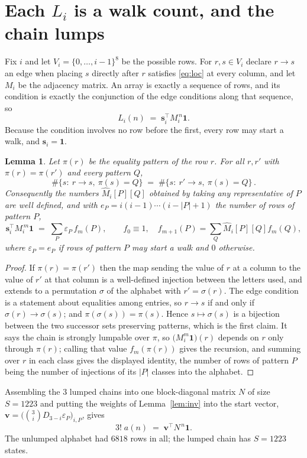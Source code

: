 \documentclass[11pt,a4paper]{article}
\theoremstyle{plain}
\newtheorem{lemma}[theorem]{Lemma}
\theoremstyle{definition}
\begin{document}
\section{Each $L_i$ is a walk count, and the chain lumps}

Fix $i$ and let $V_i=\{0,\dots,i-1\}^{8}$ be the possible rows. For $r,s\in V_i$
declare $r\to s$ an edge when placing $s$ directly after $r$ satisfies \eqref{eq:loc} at
every column, and let $M_i$ be the adjacency matrix. An array is exactly a sequence of
rows, and its condition is exactly the conjunction of the edge conditions along that
sequence, so
\[
L_i(n)\;=\;\mathbf{s}_i^{\!\top}M_i^{\,n}\mathbf{1} .
\]
Because the condition involves no row before the first, every
row may start a walk, and $\mathbf{s}_i=\mathbf{1}$.

\begin{lemma}\label{lem:lump}
Let $\pi(r)$ be the equality pattern of the row $r$. For all $r,r'$ with
$\pi(r)=\pi(r')$ and every pattern $Q$,
\[
\#\{s:\ r\to s,\ \pi(s)=Q\}\;=\;\#\{s:\ r'\to s,\ \pi(s)=Q\}\, .
\]
Consequently the numbers $\widehat M_i[P][Q]$ obtained by taking any representative of $P$
are well defined, and with $e_P=i(i-1)\cdots(i-|P|+1)$ the number of rows of pattern $P$,
\[
\mathbf{s}_i^{\!\top}M_i^{\,m}\mathbf{1}\;=\;\sum_P \varepsilon_P\,f_m(P),
\qquad f_0\equiv1,\quad f_{m+1}(P)=\sum_Q\widehat M_i[P][Q]f_m(Q),
\]
where $\varepsilon_P=e_P$ if rows of pattern $P$ may start a walk and $0$ otherwise.
\end{lemma}

\begin{proof}
If $\pi(r)=\pi(r')$ then the map sending the value of $r$ at a column to the value of $r'$
at that column is a well-defined injection between the letters used, and extends to a
permutation $\sigma$ of the alphabet with $r'=\sigma(r)$. The edge condition is a statement
about equalities among entries, so $r\to s$ if and only if $\sigma(r)\to\sigma(s)$; and
$\pi(\sigma(s))=\pi(s)$. Hence $s\mapsto\sigma(s)$ is a bijection between the two successor
sets preserving patterns, which is the first claim. It says the chain is strongly lumpable
over $\pi$, so $\bigl(M_i^{m}\mathbf{1}\bigr)(r)$ depends on $r$ only through $\pi(r)$;
calling that value $f_m(\pi(r))$ gives the recursion, and summing over $r$ in each class
gives the displayed identity, the number of rows of pattern $P$ being the number of
injections of its $|P|$ classes into the alphabet.
\end{proof}

Assembling the $3$ lumped chains into one block-diagonal matrix $N$ of size $S=1223$ and
putting the weights of Lemma~\ref{lem:inv} into the start vector,
$\mathbf{v}=\bigl(\binom{3}{i}D_{3-i}\varepsilon_P\bigr)_{i,P}$, gives
\begin{equation}\label{eq:walk}
3!\;a(n)\;=\;\mathbf{v}^{\!\top}N^{\,n}\mathbf{1} .
\end{equation}
The unlumped alphabet had $6818$ rows in all; the lumped chain has $S=1223$ states.
\end{document}

